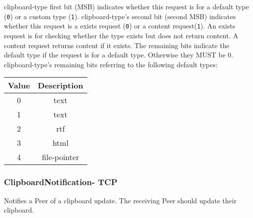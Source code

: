 clipboard-type first bit (MSB) indicates whether this request is for a default type (\texttt{0}) or a custom type
(\texttt{1}). clipboard-type's second bit (second MSB) indicates whether this request is a exists request (\texttt{0}) or a
content request(\texttt{1}). An exists request is for checking whether the type exists but does not return content. A
content request returns content if it exists. The remaining bits indicate the default type if the request is for a
default type. Otherwise they MUST be 0.\\

clipboard-type's remaining bits referring to the following default types:

\begin{center}
    \begin{tabular}{|c|c|}
        \hline
        \textbf{Value} & \textbf{Description} \\
        \hline
        0              & text                 \\
        \hline
        1              & text                 \\
        \hline
        2              & rtf                  \\
        \hline
        3              & html                 \\
        \hline
        4              & file-pointer         \\
        \hline
    \end{tabular}
\end{center}

\subsubsection{ClipboardNotification- TCP}

Notifies a Peer of a clipboard update. The receiving Peer should update their clipboard.

